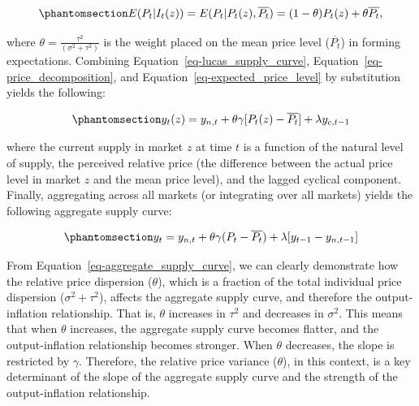 \documentclass[
  letterpaper,
  DIV=11,
  numbers=noendperiod]{scrartcl}
\begin{document}
\begin{equation}\phantomsection\label{eq-expected_price_level}{ E(P_t| I_t(z))  = E(P_t|P_t(z), \overline{P_t}) = (1-\theta)P_t(z) + \theta\overline{P_t},}\end{equation}

where \(\theta = \frac{\tau^2}{(\sigma^2 + \tau^2)}\) is the weight
placed on the mean price level (\(\overline{P_t}\)) in forming
expectations. Combining Equation~\ref{eq-lucas_supply_curve},
Equation~\ref{eq-price_decomposition}, and
Equation~\ref{eq-expected_price_level} by substitution yields the
following:

\begin{equation}\phantomsection\label{eq-lucas_supply_curve_final}{ y_t(z) = y_{n,t} + \theta \gamma[P_t(z) - \overline{P_t}] + \lambda y_{c,t-1}}\end{equation}

where the current supply in market \(z\) at time \(t\) is a function of
the natural level of supply, the perceived relative price (the
difference between the actual price level in market \(z\) and the mean
price level), and the lagged cyclical component. Finally, aggregating
across all markets (or integrating over all markets) yields the
following aggregate supply curve:

\begin{equation}\phantomsection\label{eq-aggregate_supply_curve}{y_t = y_{n,t} + \theta\gamma(P_t - \overline{P_t}) + \lambda[y_{t-1} - y_{n,t-1}]}\end{equation}

From Equation~\ref{eq-aggregate_supply_curve}, we can clearly
demonstrate how the relative price dispersion (\(\theta\)), which is a
fraction of the total individual price dispersion
(\(\sigma^2 + \tau^2\)), affects the aggregate supply curve, and
therefore the output-inflation relationship. That is, \(\theta\)
increases in \(\tau^2\) and decreases in \(\sigma^2\). This means that
when \(\theta\) increases, the aggregate supply curve becomes flatter,
and the output-inflation relationship becomes stronger. When \(\theta\)
decreases, the slope is restricted by \(\gamma\). Therefore, the
relative price variance (\(\theta\)), in this context, is a key
determinant of the slope of the aggregate supply curve and the strength
of the output-inflation relationship.
\end{document}
